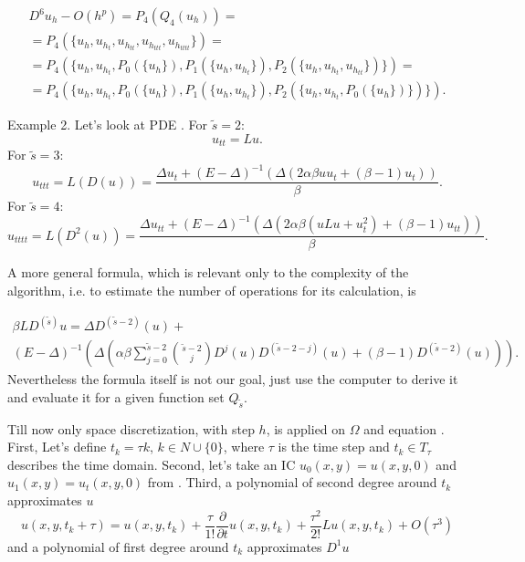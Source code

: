 \documentclass[11pt,a4paper,twoside]{article}
\begin{document}
\begin{align*} 
D^6 u_h - O(h^p) = P_4(Q_4(u_h)) =
\\
= P_4(\{u_{ h}, u_{ h_{t} }, u_{ h_{tt} }, u_{ h_{ttt} }, u_{ h_{tttt} } \}) = 
\\
= P_4(\{u_{ h}, u_{ h_{t} }, P_0(\{u_h\}),  P_1( \{ u_h, u_{ h_{t} } \} ), P_2( \{ u_h, u_{ h_{t} }, u_{ h_{tt} } \} )  \}) = 
\\ 
= P_4(\{u_{ h}, u_{ h_{t} }, P_0(\{u_h\}),  P_1( \{ u_h, u_{ h_{t} } \} ), P_2( \{ u_h, u_{ h_{t} },  P_0( \{ u_h \} ) \} )  \}).
\end{align*}

Example 2. Let's look at PDE . For $\tilde s = 2$:
$$
u_{tt} = Lu.
$$
For $\tilde s = 3$:
$$
u_{ttt} = L(D(u)) = \frac{ \Delta u_t + (E - \Delta)^{-1}           ( \Delta (2 \alpha \beta u u_t  +                          (\beta -1)u_t) )  }{\beta}.
$$
For $\tilde s = 4$:
$$
u_{tttt} = L(D^2(u)) = \frac{ \Delta u_{tt} + (E - \Delta)^{-1}( \Delta (2 \alpha \beta ( u Lu +  u_t^2 )   + (\beta -1) u_{tt} ) )  }{\beta}.
$$

A more general formula, which is relevant only to the complexity of the algorithm, i.e. to estimate the number of operations for its calculation, is

\begin{align*}
\beta LD^{(\tilde s)} u =   \Delta D^{ (\tilde s - 2) }(u)  +
\\
 (E - \Delta)^{-1}( \Delta ( \alpha \beta \sum_{j=0}^{ \tilde s - 2}  { \tilde s - 2\choose j} D^j(u) D^{ (\tilde s - 2 - j) }(u)+ (\beta -1) D^{ (\tilde s - 2) }(u) ) ).
\end{align*}
Nevertheless the formula itself is not our goal, just use the computer to derive it and evaluate it for a given function set $Q_{\tilde s}$.
\fi


Till now only space discretization, with step $h$, is applied on $\Omega$ and equation . First, Let's define $t_k = \tau k$, $k \in N \cup \{0\}$, where $\tau$ is the time step and $t_k \in T_{\tau}$ describes the time domain. Second, let's take an IC $u_0(x,y) = u(x,y,0)$ and $u_1(x,y) = u_t(x,y,0)$ from \cite{EllipticProblem}. Third, 
a polynomial of second degree around $t_k$ approximates $u$
\begin{equation}\label{taylor21}
u(x,y,t_k+\tau) = u(x,y,t_k) + \frac{\tau } {1!} \frac{ \partial }{ \partial t } u(x,y,t_k ) + \frac{ \tau^2 } { 2! }Lu(x,y,t_k ) + O(\tau^3)
\end{equation}
and a polynomial of first degree around $t_k$ approximates $D^1u$
\end{document}
